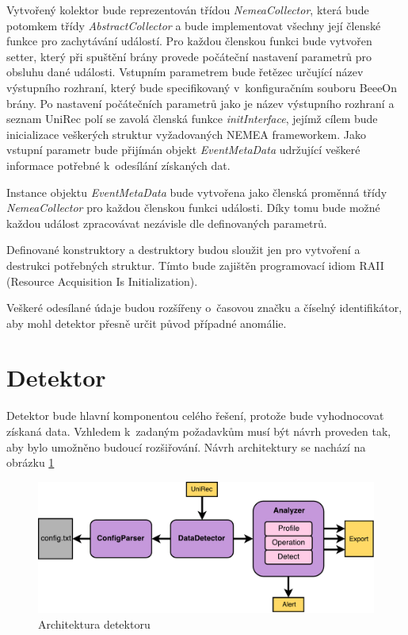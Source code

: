  Vytvořený kolektor bude reprezentován třídou \textit{NemeaCollector}, která bude potomkem třídy
 \textit{AbstractCollector} a bude implementovat všechny její členské funkce pro zachytávání událostí. Pro každou 
 členskou funkci  bude vytvořen setter, který při spuštění brány provede počáteční nastavení
 parametrů pro obsluhu dané 
 události. Vstupním parametrem bude řetězec určující název výstupního rozhraní, který bude
 specifikovaný
v~konfiguračním souboru BeeeOn brány. Po nastavení počátečních parametrů jako je název výstupního
 rozhraní a seznam UniRec polí se zavolá členská funkce \textit{initInterface}, jejímž cílem bude inicializace
 veškerých struktur vyžadovaných NEMEA frameworkem.
 Jako vstupní parametr bude přijímán objekt \textit{EventMetaData} udržující veškeré informace potřebné 
 k~odesílání získaných dat.
 
 Instance objektu \textit{EventMetaData} bude vytvořena jako členská proměnná třídy \textit{NemeaCollector}
 pro každou členskou funkci události. Díky tomu bude možné každou událost zpracovávat nezávisle dle
 definovaných parametrů.
 
 Definované konstruktory a destruktory budou sloužit jen pro vytvoření a destrukci potřebných 
 struktur. Tímto bude zajištěn programovací idiom RAII (Resource Acquisition Is Initialization).
 
 Veškeré odesílané údaje budou rozšířeny o~časovou značku a číselný identifikátor, aby mohl detektor
 přesně určit původ případné anomálie.
    
 \section{Detektor}
 Detektor bude hlavní komponentou celého řešení, protože bude vyhodnocovat získaná data. Vzhledem
 k~zadaným požadavkům musí být návrh proveden tak, aby bylo umožněno budoucí rozšiřování. Návrh 
 architektury se nachází na obrázku \ref{obr.detektor}
 \begin{figure}[ht]
   \begin{center}
   \includegraphics[scale=0.5]{pictures/detektor-arch}
   \caption{Architektura detektoru}
   \label{obr.detektor}
   \end{center}
   \end{figure}

